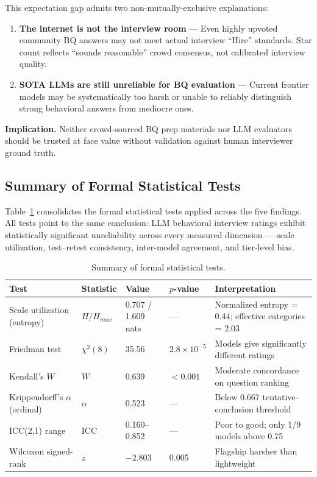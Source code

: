 \documentclass{article}
\begin{document}
This expectation gap admits two non-mutually-exclusive explanations:
\begin{enumerate}
  \item \textbf{The internet is not the interview room} --- Even highly upvoted community BQ answers may not meet actual interview ``Hire'' standards. Star count reflects ``sounds reasonable'' crowd consensus, not calibrated interview quality.
  \item \textbf{SOTA LLMs are still unreliable for BQ evaluation} --- Current frontier models may be systematically too harsh or unable to reliably distinguish strong behavioral answers from mediocre ones.
\end{enumerate}

\textbf{Implication.} Neither crowd-sourced BQ prep materials nor LLM evaluators should be trusted at face value without validation against human interviewer ground truth.

\subsection{Summary of Formal Statistical Tests}

Table~\ref{tab:tests} consolidates the formal statistical tests applied across the five findings. All tests point to the same conclusion: LLM behavioral interview ratings exhibit statistically significant unreliability across every measured dimension --- scale utilization, test--retest consistency, inter-model agreement, and tier-level bias.

\begin{table}[h]
\caption{Summary of formal statistical tests.}
\label{tab:tests}
\centering
\small
\begin{tabular}{llllp{4.3cm}}
\toprule
\textbf{Test} & \textbf{Statistic} & \textbf{Value} & \textbf{$p$-value} & \textbf{Interpretation} \\
\midrule
Scale utilization (entropy) & $H/H_{max}$ & 0.707 / 1.609 nats & --- & Normalized entropy = 0.44; effective categories = 2.03 \\
Friedman test & $\chi^2(8)$ & 35.56 & $2.8\times10^{-5}$ & Models give significantly different ratings \\
Kendall's $W$ & $W$ & 0.639 & $<0.001$ & Moderate concordance on question ranking \\
Krippendorff's $\alpha$ (ordinal) & $\alpha$ & 0.523 & --- & Below 0.667 tentative-conclusion threshold \\
ICC(2,1) range & ICC & 0.160--0.852 & --- & Poor to good; only 1/9 models above 0.75 \\
Wilcoxon signed-rank & $z$ & $-2.803$ & 0.005 & Flagship harsher than lightweight \\
\bottomrule
\end{tabular}
\end{table}
\end{document}
